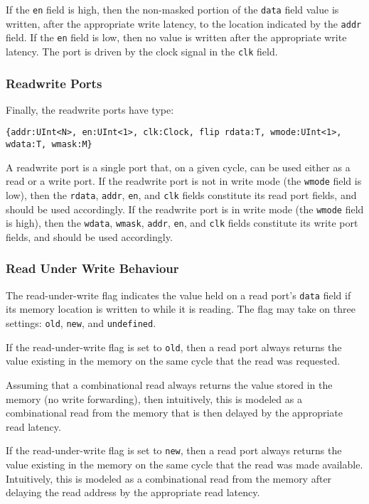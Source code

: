 \documentclass[12pt]{article}
\begin{document}
If the \verb|en| field is high, then the non-masked portion of the \verb|data| field value is written, after the appropriate write latency, to the location indicated by the \verb|addr| field. If the \verb|en| field is low, then no value is written after the appropriate write latency. The port is driven by the clock signal in the \verb|clk| field.

\subsubsection{Readwrite Ports}
Finally, the readwrite ports have type:
\begin{lstlisting}
{addr:UInt<N>, en:UInt<1>, clk:Clock, flip rdata:T, wmode:UInt<1>, wdata:T, wmask:M}
\end{lstlisting}
A readwrite port is a single port that, on a given cycle, can be used either as a read or a write port. If the readwrite port is not in write mode (the \verb|wmode| field is low), then the \verb|rdata|, \verb|addr|, \verb|en|, and \verb|clk| fields constitute its read port fields, and should be used accordingly. If the readwrite port is in write mode (the \verb|wmode| field is high), then the \verb|wdata|, \verb|wmask|, \verb|addr|, \verb|en|, and \verb|clk| fields constitute its write port fields, and should be used accordingly.

\subsubsection{Read Under Write Behaviour}

The read-under-write flag indicates the value held on a read port's \verb|data| field if its memory location is written to while it is reading. The flag may take on three settings: \verb|old|, \verb|new|, and \verb|undefined|.

If the read-under-write flag is set to \verb|old|, then a read port always returns the value existing in the memory on the same cycle that the read was requested.

Assuming that a combinational read always returns the value stored in the memory (no write forwarding), then intuitively, this is modeled as a combinational read from the memory that is then delayed by the appropriate read latency.

If the read-under-write flag is set to \verb|new|, then a read port always returns the value existing in the memory on the same cycle that the read was made available. Intuitively, this is modeled as a combinational read from the memory after delaying the read address by the appropriate read latency.
\end{document}
